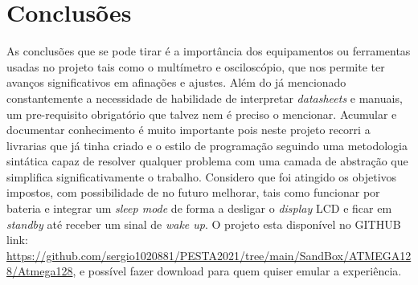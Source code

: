 \section{Conclusões}
\begin{frame}
	As conclusões que se pode tirar é a importância dos equipamentos ou ferramentas usadas no projeto tais como o multímetro e osciloscópio, que nos permite ter avanços significativos em afinações e ajustes. Além do já mencionado constantemente a necessidade de habilidade de interpretar \textit{datasheets} e manuais, um pre-requisito obrigatório que talvez nem é preciso o mencionar.
	\newline
	Acumular e documentar conhecimento é muito importante pois neste projeto recorri a livrarias que já tinha criado e o estilo de programação seguindo uma metodologia sintática capaz de resolver qualquer problema com uma camada de abstração que simplifica significativamente o trabalho. 
	\newline
	\newline
	Considero que foi atingido os objetivos impostos, com possibilidade de no futuro melhorar, tais como funcionar por bateria e integrar um \textit{sleep mode} de forma a desligar o \textit{display} LCD e ficar em \textit{standby} até receber um sinal de \textit{wake up}.
	\newline
	\newline
	O projeto esta disponível no GITHUB link: \url{https://github.com/sergio1020881/PESTA2021/tree/main/SandBox/ATMEGA128/Atmega128}, e possível fazer download para quem quiser emular a experiência.
\end{frame}
